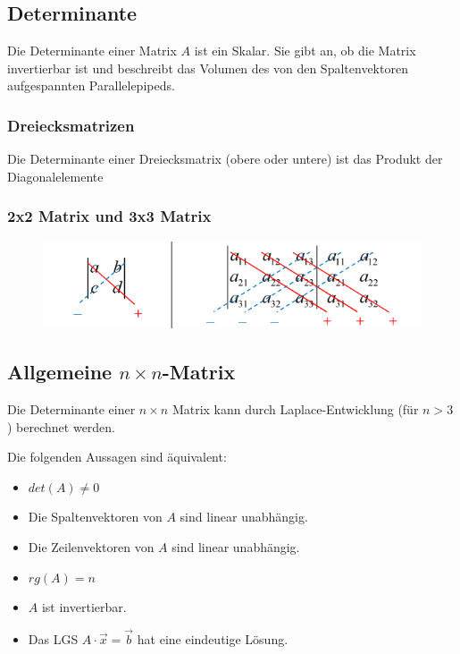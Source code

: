 \documentclass{article}
\begin{document}
\hfill
\begin{minipage}[t]{0.45\textwidth}
    \subsection*{Determinante}
    Die Determinante einer Matrix \( A \) ist ein Skalar. Sie gibt an, ob die Matrix invertierbar ist und beschreibt das Volumen des von den Spaltenvektoren aufgespannten Parallelepipeds.

    \subsubsection*{Dreiecksmatrizen}
    Die Determinante einer Dreiecksmatrix (obere oder untere) ist das Produkt der Diagonalelemente
    \subsubsection*{2x2 Matrix und 3x3 Matrix}
     \begin{figure}[H]
        \includegraphics[scale=0.3]{images/determinante.png}
     \end{figure}

    \subsection*{Allgemeine $n \times n$-Matrix}
    Die Determinante einer \( n \times n \) Matrix kann durch Laplace-Entwicklung (für \( n > 3 \)) berechnet werden.
    
    
    Die folgenden Aussagen sind äquivalent:
    \begin{itemize}
        \item $det(A) \neq 0$ 
        \item Die Spaltenvektoren von $A$ sind linear unabhängig.
        \item Die Zeilenvektoren von $A$ sind linear unabhängig.
        \item $rg(A) = n$
        \item $A$ ist invertierbar.
        \item Das LGS $A \cdot \vec{x} = \vec{b}$ hat eine eindeutige Lösung.
    \end{itemize}
\end{minipage}
\end{document}
